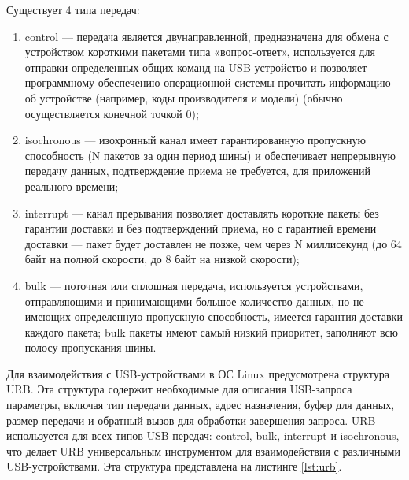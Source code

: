 Существует 4 типа передач:
\begin{enumerate}
	\item control --- передача является двунаправленной, предназначена для обмена с устройством короткими пакетами типа «вопрос-ответ», используется для отправки определенных общих команд на USB-устройство и позволяет программному обеспечению операционной системы прочитать информацию об устройстве (например, коды производителя и модели) (обычно осуществляется конечной точкой 0);
	\item isochronous --- изохронный канал имеет гарантированную пропускную способность (N пакетов за один период шины) и обеспечивает непрерывную передачу данных, подтверждение приема не требуется, для приложений реального времени;
	\item interrupt --- канал прерывания позволяет доставлять короткие пакеты без гарантии доставки и без подтверждений приема, но с гарантией времени доставки --- пакет будет доставлен не позже, чем через N миллисекунд (до 64 байт на полной скорости, до 8 байт на низкой скорости);
	\item bulk --- поточная или сплошная передача, используется устройствами, отправляющими и принимающими большое количество данных, но не имеющих определенную пропускную способность, имеется гарантия доставки каждого пакета; bulk пакеты имеют самый низкий приоритет, заполняют всю полосу пропускания шины.
\end{enumerate}

Для взаимодействия с USB-устройствами в ОС Linux предусмотрена структура URB.
Эта структура содержит необходимые для описания USB-запроса параметры, включая тип передачи данных, адрес назначения, буфер для данных, размер передачи и обратный вызов для обработки завершения запроса.
URB используется для всех типов USB-передач: control, bulk, interrupt и isochronous, что делает URB универсальным инструментом для взаимодействия с различными USB-устройствами.
Эта структура представлена на листинге \ref{lst:urb}.

